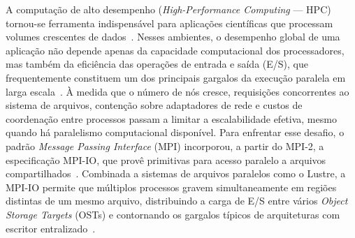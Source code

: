 \documentclass[12pt]{article}
\begin{document}
A computação de alto desempenho (\textit{High-Performance Computing} --- HPC) tornou-se ferramenta indispensável para aplicações científicas que processam volumes crescentes de dados~\cite{Kang:20}. Nesses ambientes, o desempenho global de uma aplicação não depende apenas da capacidade computacional dos processadores, mas também da eficiência das operações de entrada e saída (E/S), que frequentemente constituem um dos principais gargalos da execução paralela em larga escala~\cite{Luu:15, Xie:20}. À medida que o número de nós cresce, requisições concorrentes ao sistema de arquivos, contenção sobre adaptadores de rede e custos de coordenação entre processos passam a limitar a escalabilidade efetiva, mesmo quando há paralelismo computacional disponível. Para enfrentar esse desafio, o padrão \textit{Message Passing Interface} (MPI) incorporou, a partir do MPI-2, a especificação MPI-IO, que provê primitivas para acesso paralelo a arquivos compartilhados~\cite{mpi50Cite}. Combinada a sistemas de arquivos paralelos como o Lustre, a MPI-IO permite que múltiplos processos gravem simultaneamente em regiões distintas de um mesmo arquivo, distribuindo a carga de E/S entre vários \textit{Object Storage Targets} (OSTs) e contornando os gargalos típicos de arquiteturas com escritor entralizado~\cite{LustreManual}.
\end{document}

